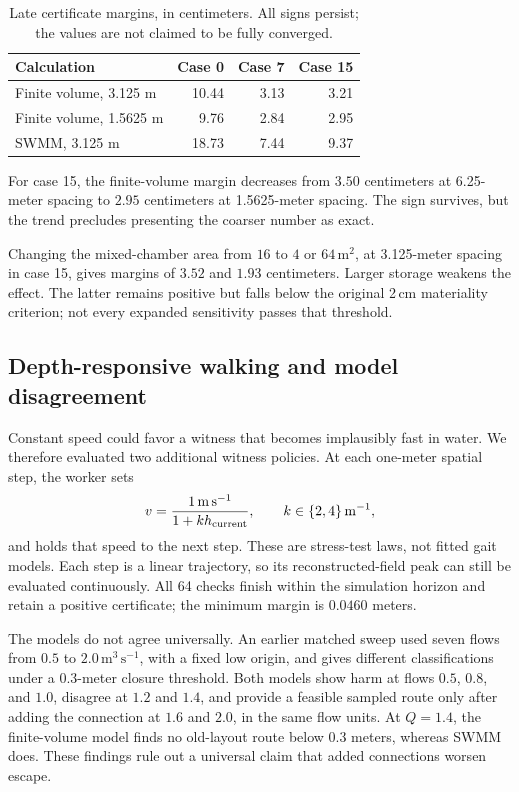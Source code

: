 \documentclass[11pt]{article}
\begin{document}
\begin{table}[htbp]\centering
\caption{Late certificate margins, in centimeters. All signs persist; the values are not claimed to be fully converged.}\label{tab:refinement}
\begin{tabular}{lrrr}\toprule
Calculation & Case 0 & Case 7 & Case 15\\\midrule
Finite volume, 3.125 m &10.44&3.13&3.21\\
Finite volume, 1.5625 m&9.76&2.84&2.95\\
SWMM, 3.125 m&18.73&7.44&9.37\\\bottomrule
\end{tabular}
\end{table}

For case 15, the finite-volume margin decreases from \(3.50\) centimeters at 6.25-meter spacing to \(2.95\) centimeters at 1.5625-meter spacing. The sign survives, but the trend precludes presenting the coarser number as exact.

Changing the mixed-chamber area from \(16\) to \(4\) or \(64\,\mathrm{m^2}\), at 3.125-meter spacing in case 15, gives margins of \(3.52\) and \(1.93\) centimeters. Larger storage weakens the effect. The latter remains positive but falls below the original 2\,cm materiality criterion; not every expanded sensitivity passes that threshold.

\subsection{Depth-responsive walking and model disagreement}
Constant speed could favor a witness that becomes implausibly fast in water. We therefore evaluated two additional witness policies. At each one-meter spatial step, the worker sets
\[
 v=\frac{1\,\mathrm{m\,s^{-1}}}{1+k h_{\rm current}},
 \qquad k\in\{2,4\}\,\mathrm{m^{-1}},
\]
and holds that speed to the next step. These are stress-test laws, not fitted gait models. Each step is a linear trajectory, so its reconstructed-field peak can still be evaluated continuously. All 64 checks finish within the simulation horizon and retain a positive certificate; the minimum margin is \(0.0460\) meters.

The models do not agree universally. An earlier matched sweep used seven flows from \(0.5\) to \(2.0\,\mathrm{m^3\,s^{-1}}\), with a fixed low origin, and gives different classifications under a 0.3-meter closure threshold. Both models show harm at flows \(0.5\), \(0.8\), and \(1.0\), disagree at \(1.2\) and \(1.4\), and provide a feasible sampled route only after adding the connection at \(1.6\) and \(2.0\), in the same flow units. At \(Q=1.4\), the finite-volume model finds no old-layout route below 0.3 meters, whereas SWMM does. These findings rule out a universal claim that added connections worsen escape.
\end{document}
